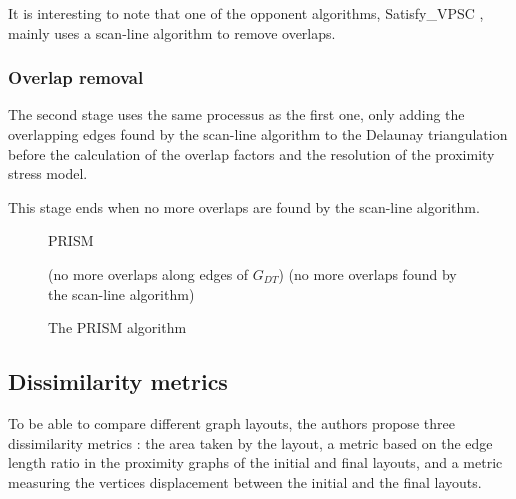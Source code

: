 \documentclass[12pt]{report}
\begin{document}
\bigskip
It is interesting to note that one of the opponent algorithms, Satisfy\_VPSC \cite{VPSC06}, mainly uses a scan-line algorithm to remove overlaps.

\subsubsection{Overlap removal}

The second stage uses the same processus as the first one, only adding the overlapping edges found by the scan-line algorithm to the Delaunay triangulation before the calculation of the overlap factors and the resolution of the proximity stress model.

This stage ends when no more overlaps are found by the scan-line algorithm.

\begin{figure}
\begin{algorithm}[H]
\caption{PRISM}
	 
(no more overlaps along edges of $G_{DT}$)
\BlankLine
{}	
(no more overlaps found by the scan-line algorithm)
\end{algorithm}
\caption{The PRISM algorithm}
\end{figure}

\subsection{Dissimilarity metrics}

To be able to compare different graph layouts, the authors propose three dissimilarity metrics : the area taken by the layout, a metric based on the edge length ratio in the proximity graphs of the initial and final layouts, and a metric measuring the vertices displacement between the initial and the final layouts.
\end{document}
